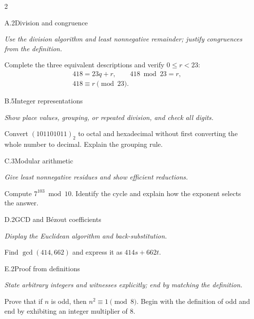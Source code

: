 \documentclass[9pt]{extarticle}
\begin{document}
\begin{multicols}{2}
\begin{CoreProblem}{A.2}{Division and congruence}
{\scriptsize\textit{Use the division algorithm and least nonnegative remainder; justify congruences from the definition.}\par}
Complete the three equivalent descriptions and verify $0\le r<23$:
\[
\begin{gathered}
418=23q+r,\qquad 418\bmod 23=r,\\
418\equiv r\pmod{23}.
\end{gathered}
\]
\end{CoreProblem}
\begin{CoreProblem}{B.5}{Integer representations}
{\scriptsize\textit{Show place values, grouping, or repeated division, and check all digits.}\par}
Convert $(101101011)_2$ to octal and hexadecimal without first converting the
whole number to decimal. Explain the grouping rule.
\end{CoreProblem}
\begin{CoreProblem}{C.3}{Modular arithmetic}
{\scriptsize\textit{Give least nonnegative residues and show efficient reductions.}\par}
Compute $7^{103}\bmod10$. Identify the cycle and explain how the exponent
selects the answer.
\end{CoreProblem}
\columnbreak
\begin{CoreProblem}{D.2}{GCD and B\'ezout coefficients}
{\scriptsize\textit{Display the Euclidean algorithm and back-substitution.}\par}
Find $\gcd(414,662)$ and express it as $414s+662t$.
\end{CoreProblem}
\begin{CoreProblem}{E.2}{Proof from definitions}
{\scriptsize\textit{State arbitrary integers and witnesses explicitly; end by matching the definition.}\par}
Prove that if $n$ is odd, then $n^2\equiv1\pmod{8}$. Begin with the definition
of odd and end by exhibiting an integer multiplier of $8$.
\end{CoreProblem}
\end{multicols}
\CoreWorkArea
\FormBreak
{}
\end{document}
